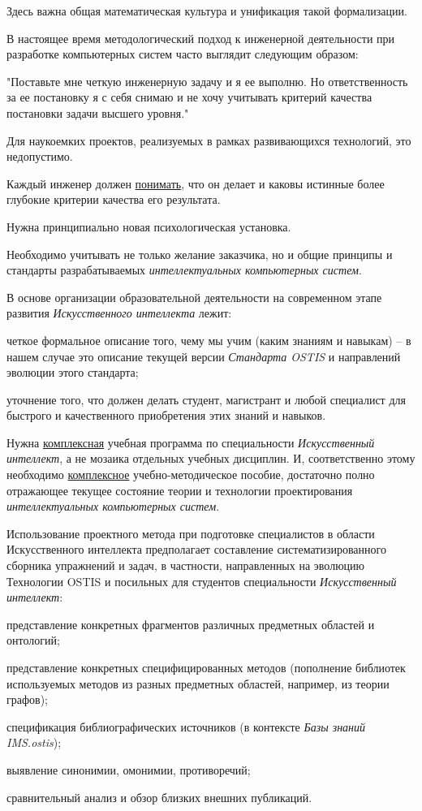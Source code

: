 {	Здесь важна общая математическая культура и унификация такой формализации.
	
	В настоящее время методологический подход к инженерной деятельности при разработке компьютерных систем часто выглядит следующим образом:
	
	"Поставьте мне четкую инженерную задачу и я ее выполню. Но ответственность за ее постановку я с себя снимаю и не хочу учитывать критерий качества постановки задачи высшего уровня."{}
	
	Для наукоемких проектов, реализуемых в рамках развивающихся технологий, это недопустимо.
	
	Каждый инженер должен \uline{понимать}, что он делает и каковы истинные более глубокие критерии качества его результата.
	
	Нужна принципиально новая психологическая установка.
	
	Необходимо учитывать не только желание заказчика, но и общие принципы и стандарты разрабатываемых \textit{интеллектуальных компьютерных систем}.
	
	В основе организации образовательной деятельности на современном этапе развития \textit{Искусственного интеллекта} лежит:
	\begin{scnitemize}
		\item четкое формальное описание того, чему мы учим (каким знаниям и навыкам) -- в нашем случае это описание текущей версии \textit{Стандарта OSTIS} и направлений эволюции этого стандарта;
		\item уточнение того, что должен делать студент, магистрант и любой специалист для быстрого и качественного приобретения этих знаний и навыков.
	\end{scnitemize}
	
	Нужна \uline{комплексная} учебная программа по специальности \textit{Искусственный интеллект}, а не мозаика отдельных учебных дисциплин. И, соответственно этому необходимо \uline{комплексное} учебно-методическое пособие, достаточно полно отражающее текущее состояние теории и технологии проектирования \textit{интеллектуальных компьютерных систем}.
	
	Использование проектного метода при подготовке специалистов в области Искусственного интеллекта предполагает составление систематизированного сборника упражнений и задач, в частности, направленных на эволюцию Технологии OSTIS и посильных для студентов специальности \textit{Искусственный интеллект}:
	\begin{scnitemize}
		\item представление конкретных фрагментов различных предметных областей и онтологий;	
		\item представление конкретных специфицированных методов (пополнение библиотек используемых методов из разных предметных областей, например, из теории графов);
		\item спецификация библиографических источников (в контексте \textit{Базы знаний IMS.ostis});
		\item выявление синонимии, омонимии, противоречий;
		\item сравнительный анализ и обзор близких внешних публикаций.
	\end{scnitemize}
	
}

